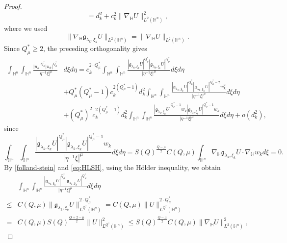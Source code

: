 \documentclass[11pt]{article}
\begin{document}
\begin{proof}
\begin{equation*}
 =d_k^2+c_k^2\|\nabla_\mathbb{H}U\|^2_{L^{2}(\mathbb{H}^n)},
 \end{equation*}
 where we used
 \begin{equation*}
 \|\nabla_\mathbb{H}\mathfrak{g}_{\lambda_k,\xi_k}U\|_{L^{2}(\mathbb{H}^n)}=\|\nabla_\mathbb{H}U\|
 _{L^{2}(\mathbb{H}^n)}.
 \end{equation*}
 {Since $Q^{\ast}_{\mu}\geq2$, the preceding orthogonality gives}
 \begin{align}\label{local3}
 \int_{\mathbb{H}^{n}}\int_{\mathbb{H}^{n}}\frac{|u_k|^{Q^{\ast}_{\mu}}|u_k|
^{Q^{\ast}_{\mu}}}{|\eta^{-1}\xi|^{\mu}}&{d}\xi{d}\eta
 = c_k^{2\cdot Q_{\mu}^{\ast}} \int_{\mathbb{H}^{n}}\int_{\mathbb{H}^{n}}\frac{|\mathfrak{g}_{\lambda_k,\xi_k}U|^{Q^{\ast}_{\mu}}|\mathfrak{g}_{\lambda_k,\xi_k}U|
^{Q^{\ast}_{\mu}}}{|\eta^{-1}\xi|^{\mu}}{d}\xi{d}\eta
\nonumber \\& + Q_{\mu}^{\ast}(Q_{\mu}^{\ast}-1)c_k^{2(Q_{\mu}^{\ast}-1)}d_k^2 {\int_{\mathbb{H}^{n}}\int_{\mathbb{H}^{n}}\frac{|\mathfrak{g}_{\lambda_k,\xi_k}U|^{Q^{\ast}_{\mu}}|\mathfrak{g}_{\lambda_k,\xi_k}U|
^{Q^{\ast}_{\mu}-2} w_k^2}{|\eta^{-1}\xi|^{\mu}}{d}\xi{d}\eta} \nonumber\\
 & + (Q_{\mu}^{\ast})^2c_k^{2(Q_{\mu}^{\ast}-1)}d_k^2 \int_{\mathbb{H}^{n}}\int_{\mathbb{H}^{n}}\frac{|\mathfrak{g}_{\lambda_k,\xi_k}U|^{Q^{\ast}_{\mu}-1}w_k|\mathfrak{g}_{\lambda_k,\xi_k}U|
^{Q^{\ast}_{\mu}-1}w_k}{|\eta^{-1}\xi|^{\mu}}{d}\xi{d}\eta+ o(d_k^2),
 \end{align}
 since
 \begin{equation*}
 \int_{\mathbb{H}^{n}}\int_{\mathbb{H}^{n}}\frac{|\mathfrak{g}_{\lambda_k,\xi_k}U|^{Q^{\ast}_{\mu}}|\mathfrak{g}_{\lambda_k,\xi_k}U|
^{Q^{\ast}_{\mu}-1}w_k}{|\eta^{-1}\xi|^{\mu}}{d}\xi{d}\eta=S(Q)^{\frac{Q-\mu}{2}}C(Q,\mu)\int_{\mathbb{H}^{n}} \nabla_\mathbb{H}\mathfrak{g}_{\lambda_k,\xi_k}U\cdot \nabla_\mathbb{H}w_k d\xi=0.
 \end{equation*}
By \eqref{folland-stein} and \eqref{eq:HLSH}, using the
 H\"{o}lder inequality, we obtain
 \begin{align*}
 &\int_{\mathbb{H}^{n}}\int_{\mathbb{H}^{n}}\frac{|\mathfrak{g}_{\lambda_k,\xi_k}U|^{Q^{\ast}_{\mu}}|\mathfrak{g}_{\lambda_k,\xi_k}U|
^{Q^{\ast}_{\mu}}}{|\eta^{-1}\xi|^{\mu}}{d}\xi{d}\eta \\ \leq & C(Q,\mu)\|\mathfrak{g}_{\lambda_k,\xi_k}U\|_{L^{Q^{\ast}}(\mathbb{H}^{n})}^{2\cdot Q^{\ast}_{\mu}}=
C(Q,\mu)\|U\|_{L^{Q^{\ast}}(\mathbb{H}^{n})}^{2\cdot Q^{\ast}_{\mu}}\\
=&C(Q,\mu)S(Q)^{\frac{Q+2-\mu}{2}}\|U\|_{L^{Q^{\ast}}(\mathbb{H}^{n})}^{2}\leq S(Q)^{\frac{Q-\mu}{2}}C(Q,\mu)\|\nabla_\mathbb{H}U\|^2_{L^{2}(\mathbb{H}^{n})},

\end{align*}
\end{proof}
\end{document}
